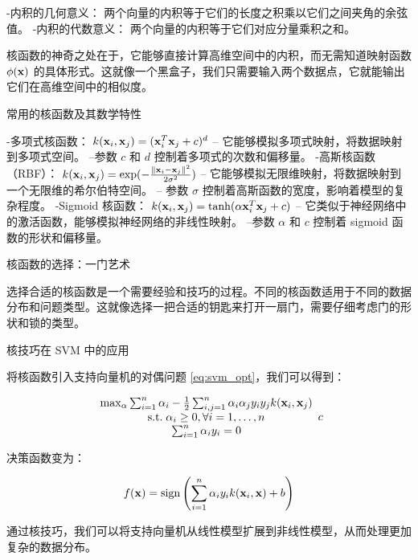 {-内积的几何意义： 两个向量的内积等于它们的长度之积乘以它们之间夹角的余弦值。
-内积的代数意义： 两个向量的内积等于它们对应分量乘积之和。

核函数的神奇之处在于，它能够直接计算高维空间中的内积，而无需知道映射函数 $\phi({\bf x})$ 的具体形式。这就像一个黑盒子，我们只需要输入两个数据点，它就能输出它们在高维空间中的相似度。

 常用的核函数及其数学特性

-多项式核函数： $k({\bf x}_i, {\bf x}_j) = ({\bf x}_i^T {\bf x}_j + c)^d$
    -- 它能够模拟多项式映射，将数据映射到多项式空间。
    --参数 $c$ 和 $d$ 控制着多项式的次数和偏移量。
-高斯核函数（RBF）： $k({\bf x}_i, {\bf x}_j) = \exp(-\frac{\|{\bf x}_i - {\bf x}_j\|^2}{2\sigma^2})$
   -- 它能够模拟无限维映射，将数据映射到一个无限维的希尔伯特空间。
    -- 参数 $\sigma$ 控制着高斯函数的宽度，影响着模型的复杂程度。
-Sigmoid 核函数： $k({\bf x}_i, {\bf x}_j) = \tanh(\alpha {\bf x}_i^T {\bf x}_j + c)$
    -- 它类似于神经网络中的激活函数，能够模拟神经网络的非线性映射。
    --参数 $\alpha$ 和 $c$ 控制着 sigmoid 函数的形状和偏移量。

 核函数的选择：一门艺术

选择合适的核函数是一个需要经验和技巧的过程。不同的核函数适用于不同的数据分布和问题类型。这就像选择一把合适的钥匙来打开一扇门，需要仔细考虑门的形状和锁的类型。

 核技巧在 SVM 中的应用

将核函数引入支持向量机的对偶问题 \eqref{eq:svm_opt}，我们可以得到：

\begin{equation}\label{eq:svm_kernel_opt}
\begin{array}{c}
{\rm max}_{\alpha} \sum_{i=1}^n \alpha_i -\frac{1}{2} \sum_{i,j=1}^n \alpha_i \alpha_j y_i y_j k({\bf x}_i, {\bf x}_j) \\
{\rm s.t.} \; \alpha_i \ge 0, \forall i=1, \dots, n \\
\; \sum_{i=1}^n \alpha_i y_i =0
\; \end{array}{c}
\end{equation}

决策函数变为：

\begin{equation}\label{eq:svm_kernel_decision}
f({\bf x}) = {\rm sign}\left(\sum_{i=1}^n \alpha_i y_i k({\bf x}_i, {\bf x}) + b\right)
\end{equation}

通过核技巧，我们可以将支持向量机从线性模型扩展到非线性模型，从而处理更加复杂的数据分布。

}
